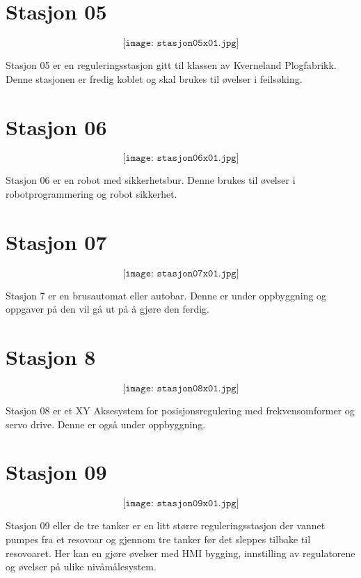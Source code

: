 \section{Stasjon 05}

$$\texttt{[image: stasjon05x01.jpg]}$$

Stasjon 05 er en reguleringsstasjon gitt til klassen av Kverneland Plogfabrikk. Denne stasjonen er fredig koblet og skal brukes til øvelser i feilsøking. 

\section{Stasjon 06}

$$\texttt{[image: stasjon06x01.jpg]}$$

Stasjon 06 er en robot med sikkerhetsbur. Denne brukes til øvelser i robotprogrammering og robot sikkerhet. 
\section{Stasjon 07}

$$\texttt{[image: stasjon07x01.jpg]}$$

Stasjon 7 er en brusautomat eller autobar. Denne er under oppbyggning og oppgaver på den vil gå ut på å gjøre den ferdig. 




\section{Stasjon 8}

$$\texttt{[image: stasjon08x01.jpg]}$$

Stasjon 08 er et XY Aksesystem  for posisjonsregulering med frekvensomformer og servo drive. Denne er også under oppbyggning. 

\section{Stasjon 09}

$$\texttt{[image: stasjon09x01.jpg]}$$

Stasjon 09 eller de tre tanker er en litt større reguleringsstasjon der vannet pumpes fra  et resovoar og gjennom tre tanker før det sleppes tilbake til resovoaret. Her kan en gjøre øvelser med HMI bygging, innstilling av regulatorene og øvelser på ulike nivåmålesystem. 

